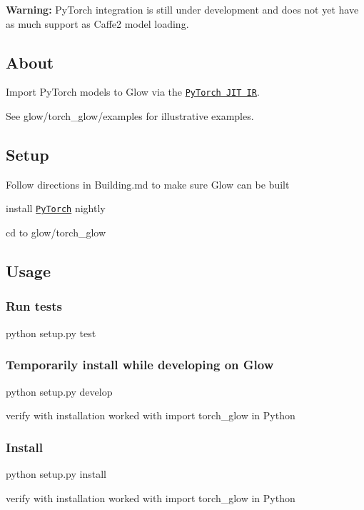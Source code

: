 {\bfseries Warning\+:} Py\+Torch integration is still under development and does not yet have as much support as Caffe2 model loading.

\subsection*{About}

Import Py\+Torch models to Glow via the \href{https://pytorch.org/docs/master/jit.html}{\tt Py\+Torch J\+IT IR}.

See {\ttfamily glow/torch\+\_\+glow/examples} for illustrative examples.

\subsection*{Setup}


\begin{DoxyItemize}
\item Follow directions in Building.\+md to make sure Glow can be built
\item install \href{https://pytorch.org/}{\tt Py\+Torch} nightly
\item cd to {\ttfamily glow/torch\+\_\+glow}
\end{DoxyItemize}

\subsection*{Usage}

\subsubsection*{Run tests}


\begin{DoxyItemize}
\item {\ttfamily python setup.\+py test} \subsubsection*{Temporarily install while developing on Glow}
\end{DoxyItemize}


\begin{DoxyItemize}
\item {\ttfamily python setup.\+py develop}
\begin{DoxyItemize}
\item verify with installation worked with {\ttfamily import torch\+\_\+glow} in Python \subsubsection*{Install}
\end{DoxyItemize}
\item {\ttfamily python setup.\+py install}
\begin{DoxyItemize}
\item verify with installation worked with {\ttfamily import torch\+\_\+glow} in Python
\end{DoxyItemize}
\end{DoxyItemize}

